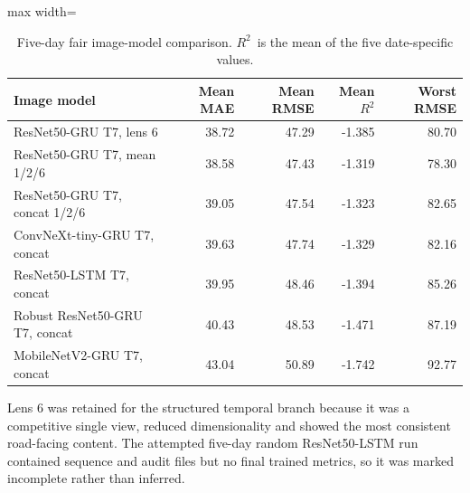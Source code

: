 \documentclass[11pt,a4paper,oneside]{report}
\newcommand{\Rtwo}{$R^2$}
\begin{document}
\begin{table}[H]
  \centering
  \caption{Five-day fair image-model comparison. \Rtwo\ is the mean of the five
  date-specific values.}
  \label{tab:backbones}
  \begin{adjustbox}{max width=\textwidth}
  \begin{tabular}{lrrrr}
    \toprule
    Image model & Mean MAE & Mean RMSE & Mean \Rtwo & Worst RMSE\\
    \midrule
    ResNet50-GRU T7, lens 6 & 38.72 & 47.29 & -1.385 & 80.70\\
    ResNet50-GRU T7, mean 1/2/6 & 38.58 & 47.43 & -1.319 & 78.30\\
    ResNet50-GRU T7, concat 1/2/6 & 39.05 & 47.54 & -1.323 & 82.65\\
    ConvNeXt-tiny-GRU T7, concat & 39.63 & 47.74 & -1.329 & 82.16\\
    ResNet50-LSTM T7, concat & 39.95 & 48.46 & -1.394 & 85.26\\
    Robust ResNet50-GRU T7, concat & 40.43 & 48.53 & -1.471 & 87.19\\
    MobileNetV2-GRU T7, concat & 43.04 & 50.89 & -1.742 & 92.77\\
    \bottomrule
  \end{tabular}
  \end{adjustbox}
\end{table}

Lens 6 was retained for the structured temporal branch because it was a
competitive single view, reduced dimensionality and showed the most consistent
road-facing content. The attempted five-day random ResNet50-LSTM run contained
sequence and audit files but no final trained metrics, so it was marked
incomplete rather than inferred.
\end{document}
